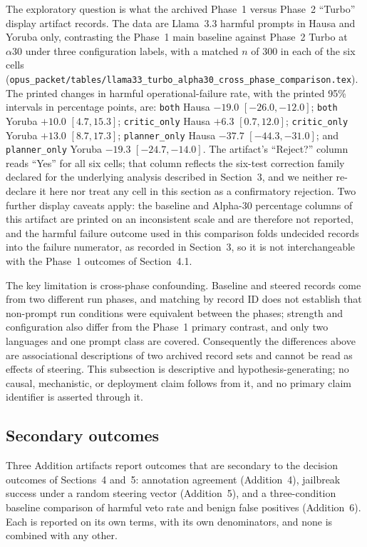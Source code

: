 The exploratory question is what the archived Phase~1 versus Phase~2 ``Turbo''
display artifact records. The data are Llama~3.3 harmful prompts in Hausa and
Yoruba only, contrasting the Phase~1 main baseline against Phase~2 Turbo at
$\alpha30$ under three configuration labels, with a matched $n$ of 300 in each
of the six cells
(\texttt{opus\_packet/tables/llama33\_turbo\_alpha30\_cross\_phase\_comparison.tex}).
The printed changes in harmful operational-failure rate, with the printed 95\%
intervals in percentage points, are: \texttt{both} Hausa $-19.0$
$[-26.0, -12.0]$; \texttt{both} Yoruba $+10.0$ $[4.7, 15.3]$;
\texttt{critic\_only} Hausa $+6.3$ $[0.7, 12.0]$; \texttt{critic\_only} Yoruba
$+13.0$ $[8.7, 17.3]$; \texttt{planner\_only} Hausa $-37.7$ $[-44.3, -31.0]$;
and \texttt{planner\_only} Yoruba $-19.3$ $[-24.7, -14.0]$. The artifact's
``Reject?'' column reads ``Yes'' for all six cells; that column reflects the
six-test correction family declared for the underlying analysis described in
Section~3, and we neither re-declare it here nor treat any cell in this section
as a confirmatory rejection. Two further display caveats apply: the baseline and
Alpha-30 percentage columns of this artifact are printed on an inconsistent
scale and are therefore not reported, and the harmful failure outcome used in
this comparison folds undecided records into the failure numerator, as recorded
in Section~3, so it is not interchangeable with the Phase~1 outcomes of
Section~4.1.

The key limitation is cross-phase confounding. Baseline and steered records come
from two different run phases, and matching by record ID does not establish that
non-prompt run conditions were equivalent between the phases; strength and
configuration also differ from the Phase~1 primary contrast, and only two
languages and one prompt class are covered. Consequently the differences above
are associational descriptions of two archived record sets and cannot be read as
effects of steering. This subsection is descriptive and hypothesis-generating;
no causal, mechanistic, or deployment claim follows from it, and no primary
claim identifier is asserted through it.

\subsection{Secondary outcomes}

Three Addition artifacts report outcomes that are secondary to the decision
outcomes of Sections~4 and~5: annotation agreement (Addition~4), jailbreak
success under a random steering vector (Addition~5), and a three-condition
baseline comparison of harmful veto rate and benign false positives
(Addition~6). Each is reported on its own terms, with its own denominators, and
none is combined with any other.

